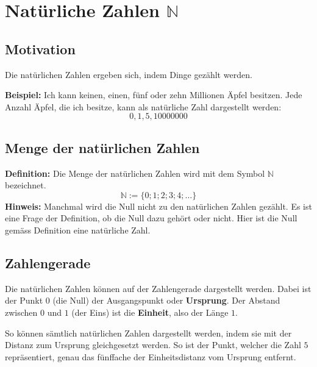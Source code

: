 \newpage
\section{Natürliche Zahlen $\mathbb{N}$}

\subsection{Motivation}

Die natürlichen Zahlen ergeben sich, indem Dinge gezählt werden.
\begin{example}
  \textbf{Beispiel:} Ich kann keinen, einen, fünf oder zehn Millionen Äpfel besitzen. Jede Anzahl Äpfel, die ich besitze, kann als natürliche Zahl dargestellt werden:
  \[
    0, 1, 5, \num{10000000}
  \]
\end{example}

\subsection{Menge der natürlichen Zahlen}

\textbf{Definition:} Die Menge der natürlichen Zahlen wird mit dem Symbol $\mathbb{N}$ bezeichnet.
\[
  \mathbb{N} := \{0; 1; 2; 3; 4; \ldots\}
\]
\textbf{Hinweis:} Manchmal wird die Null nicht zu den natürlichen Zahlen gezählt. Es ist eine Frage der Definition, ob die Null dazu gehört oder nicht. Hier ist die Null gemäss Definition eine natürliche Zahl.

\subsection{Zahlengerade}

Die natürlichen Zahlen können auf der Zahlengerade dargestellt werden. Dabei ist der Punkt $0$ (die Null) der Ausgangspunkt oder \textbf{Ursprung}. Der Abstand zwischen $0$ und $1$ (der Eins) ist die \textbf{Einheit}, also der Länge $1$.
\begin{center}
\end{center}
So können sämtlich natürlichen Zahlen dargestellt werden, indem sie mit der Distanz zum Ursprung gleichgesetzt werden. So ist der Punkt, welcher die Zahl $5$ repräsentiert, genau das fünffache der Einheitsdistanz vom Ursprung entfernt.

